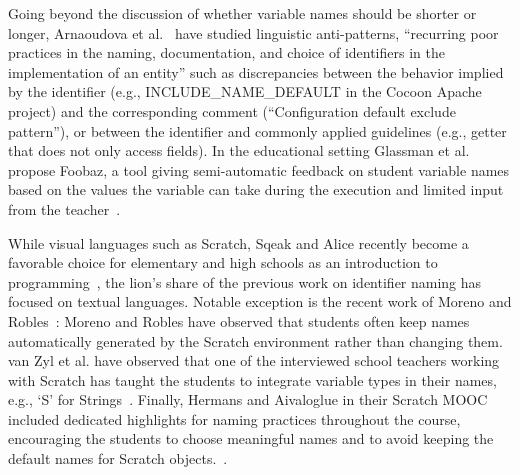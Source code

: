 \documentclass[conference]{IEEEtran}
\begin{document}
%

Going beyond the discussion of whether variable names should be shorter or longer, Arnaoudova et al.~\cite{ArnaoudovaPAG13,ArnaoudovaPA16} have studied linguistic anti-patterns, ``recurring poor practices in the naming, documentation, and choice of identifiers in the implementation of an entity'' such as discrepancies between the behavior implied by the identifier (e.g., {\sc INCLUDE\_NAME\_DEFAULT} in the Cocoon Apache project) and the corresponding comment (``Configuration default exclude pattern''), or between the identifier and commonly applied guidelines (e.g., getter that does not only access fields). 
In the educational setting Glassman et al. propose Foobaz, a tool giving semi-automatic feedback on student variable names based on the values the variable can take during the execution and limited input from the teacher~\cite{Glassman}.

While visual languages such as Scratch, Sqeak and Alice recently become a favorable choice for elementary and high schools as an introduction to programming~\cite{Matsuzawa}, the lion's share of the previous work on identifier naming has focused on textual languages.
Notable exception is the recent work of Moreno and Robles~\cite{MoreonoRobles}: Moreno and Robles have observed that students often keep names automatically generated by the Scratch environment rather than changing them. 
van Zyl et al. have observed that one of the interviewed school teachers working with Scratch has taught the students to integrate variable types in their names, e.g., `S' for Strings~\cite{vanZyl}. Finally, Hermans and Aivaloglue in their Scratch MOOC included dedicated highlights for naming practices throughout the course, encouraging the students to choose meaningful names and to avoid keeping the default names for Scratch objects.~\cite{hermans_aivaloglou}. 
\end{document}
